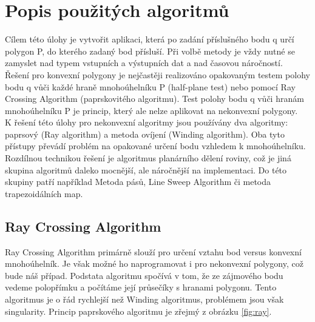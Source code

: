\documentclass[a4paper,11pt,twoside]{article}
\begin{document}

\section{Popis použitých algoritmů}
\noindent
\large
Cílem této úlohy je vytvořit aplikaci, která po zadání příslušného bodu q určí polygon P, do kterého zadaný bod přísluší. Při volbě metody je vždy nutné se zamyslet nad typem vstupních a výstupních dat a nad časovou náročností. \\
\indent Řešení pro konvexní polygony je nejčastěji realizováno opakovaným testem polohy bodu q vůči každé hraně mnohoúhelníku P (half-plane test) nebo pomocí Ray Crossing Algorithm (paprskovitého algoritmu). Test polohy bodu q vůči hranám mnohoúhelníku P je princip, který ale nelze aplikovat na nekonvexní polygony. \\
\indent K řešení této úlohy pro nekonvexní algoritmy jsou používány dva algoritmy: paprsový (Ray algorithm) a metoda ovíjení (Winding algorithm). Oba tyto přístupy převádí problém na opakované určení bodu vzhledem k mnohoúhelníku. Rozdílnou technikou řešení je algoritmus planárního dělení roviny, což je jiná skupina algoritmů daleko mocnější, ale náročnější na implementaci. Do této skupiny patří například Metoda pásů, Line Sweep Algorithm či metoda trapezoidálních map.

\subsection{Ray Crossing Algorithm}
\large
\noindent Ray Crossing Algorithm primárně slouží pro určení vztahu bod versus konvexní mnohoúhelník.  Je však možné ho naprogramovat i pro nekonvexní polygony, což bude náš případ. Podstata algoritmu spočívá v tom, že ze zájmového bodu vedeme polopřímku a počítáme její průsečíky s hranami polygonu. Tento algoritmus je o řád rychlejší než Winding algoritmus, problémem jsou však singularity. Princip paprskového algoritmu je zřejmý z obrázku \ref{fig:ray}.\\
\end{document}
